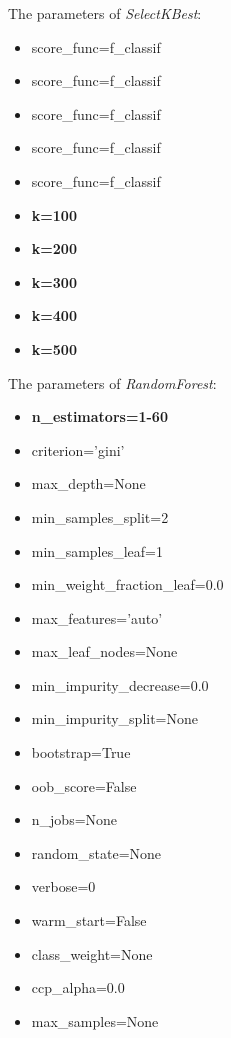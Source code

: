 \documentclass{article} %
\begin{document}
The parameters of \textit{SelectKBest}:
\begin{multicols}{2}
\begin{itemize}
    \item score\_func=f\_classif
    \item score\_func=f\_classif
    \item score\_func=f\_classif
    \item score\_func=f\_classif
    \item score\_func=f\_classif
    \item \textbf{k=100}
    \item \textbf{k=200}
    \item \textbf{k=300}
    \item \textbf{k=400}
    \item \textbf{k=500}
\end{itemize}
\end{multicols}

The parameters of \textit{RandomForest}:
\begin{multicols}{2}
\begin{itemize}
    \item \textbf{n\_estimators=1-60}
    \item criterion='gini'
    \item max\_depth=None
    \item min\_samples\_split=2
    \item min\_samples\_leaf=1
    \item min\_weight\_fraction\_leaf=0.0
    \item max\_features='auto'
    \item max\_leaf\_nodes=None
    \item min\_impurity\_decrease=0.0
    \item min\_impurity\_split=None
    \item bootstrap=True
    \item oob\_score=False
    \item n\_jobs=None
    \item random\_state=None
    \item verbose=0
    \item warm\_start=False
    \item class\_weight=None
    \item ccp\_alpha=0.0
    \item max\_samples=None
\end{itemize}
\end{multicols}
\end{document}
